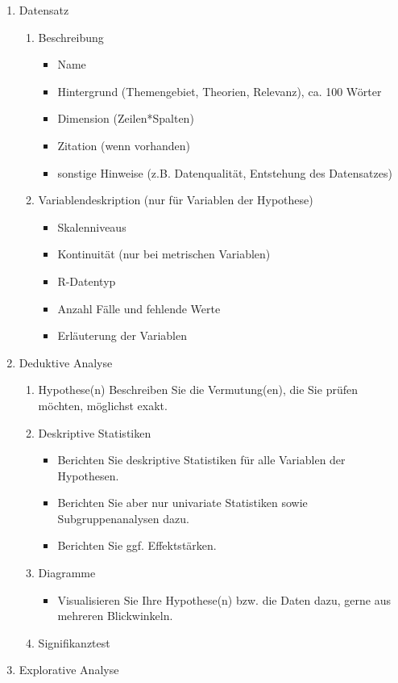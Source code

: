\documentclass[12pt,ngerman,]{book}
\providecommand{\tightlist}{%
  \setlength{\itemsep}{0pt}\setlength{\parskip}{0pt}}
\theoremstyle{definition}
\theoremstyle{definition}
\theoremstyle{remark}
\begin{document}
\begin{enumerate}
\def\labelenumi{\arabic{enumi}.}
\item
  Datensatz

  \begin{enumerate}
  \def\labelenumii{\arabic{enumii}.}
  \item
    Beschreibung

    \begin{itemize}
    \tightlist
    \item
      Name
    \item
      Hintergrund (Themengebiet, Theorien, Relevanz), ca. 100 Wörter
    \item
      Dimension (Zeilen*Spalten)
    \item
      Zitation (wenn vorhanden)
    \item
      sonstige Hinweise (z.B. Datenqualität, Entstehung des Datensatzes)
    \end{itemize}
  \item
    Variablendeskription (nur für Variablen der Hypothese)

    \begin{itemize}
    \tightlist
    \item
      Skalenniveaus
    \item
      Kontinuität (nur bei metrischen Variablen)
    \item
      R-Datentyp
    \item
      Anzahl Fälle und fehlende Werte
    \item
      Erläuterung der Variablen
    \end{itemize}
  \end{enumerate}
\item
  Deduktive Analyse

  \begin{enumerate}
  \def\labelenumii{\arabic{enumii}.}
  \item
    Hypothese(n) Beschreiben Sie die Vermutung(en), die Sie prüfen
    möchten, möglichst exakt.
  \item
    Deskriptive Statistiken

    \begin{itemize}
    \tightlist
    \item
      Berichten Sie deskriptive Statistiken für alle Variablen der
      Hypothesen.
    \item
      Berichten Sie aber nur univariate Statistiken sowie
      Subgruppenanalysen dazu.
    \item
      Berichten Sie ggf. Effektstärken.
    \end{itemize}
  \item
    Diagramme

    \begin{itemize}
    \tightlist
    \item
      Visualisieren Sie Ihre Hypothese(n) bzw. die Daten dazu, gerne aus
      mehreren Blickwinkeln.
    \end{itemize}
  \item
    Signifikanztest
  \end{enumerate}
\item
  Explorative Analyse
\end{enumerate}
\end{document}

